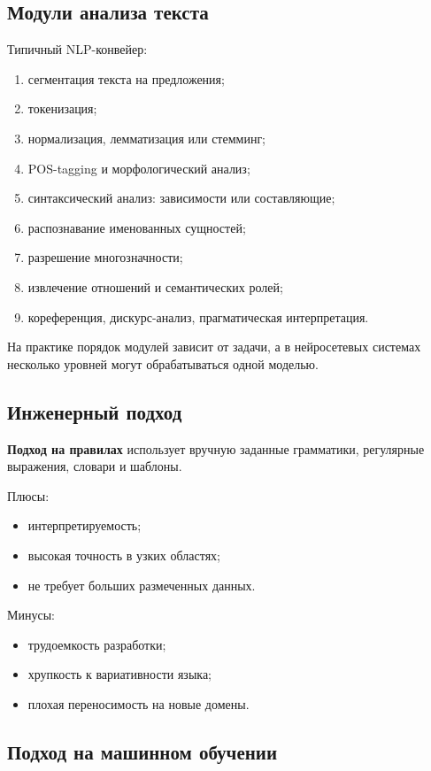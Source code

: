 \subsection*{Модули анализа текста}

Типичный NLP-конвейер:
\begin{enumerate}
    \item сегментация текста на предложения;
    \item токенизация;
    \item нормализация, лемматизация или стемминг;
    \item POS-tagging и морфологический анализ;
    \item синтаксический анализ: зависимости или составляющие;
    \item распознавание именованных сущностей;
    \item разрешение многозначности;
    \item извлечение отношений и семантических ролей;
    \item кореференция, дискурс-анализ, прагматическая интерпретация.
\end{enumerate}

На практике порядок модулей зависит от задачи, а в нейросетевых системах несколько уровней могут обрабатываться одной моделью.

\subsection*{Инженерный подход}

\textbf{Подход на правилах} использует вручную заданные грамматики, регулярные выражения, словари и шаблоны.

Плюсы:
\begin{itemize}
    \item интерпретируемость;
    \item высокая точность в узких областях;
    \item не требует больших размеченных данных.
\end{itemize}

Минусы:
\begin{itemize}
    \item трудоемкость разработки;
    \item хрупкость к вариативности языка;
    \item плохая переносимость на новые домены.
\end{itemize}

\subsection*{Подход на машинном обучении}

